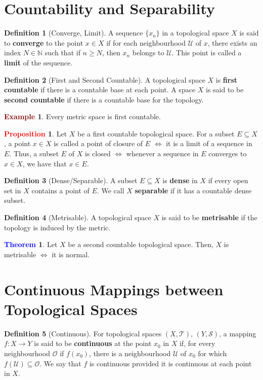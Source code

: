 \documentclass[11pt]{article}
\newcommand{\open}[0]{\mathcal{O}}
\newcommand{\topo}[0]{\mathcal{T}}
\newcommand{\hood}[0]{\mathcal{U}}
\theoremstyle{definition}
\theoremstyle{definition}
\newtheorem{theorem}{\textcolor{blue}{Theorem}}
\theoremstyle{definition}
\newtheorem{definition}{\textcolor{OliveGreen}{Definition}}
\newtheorem{prop}{\textcolor{red}{Proposition}}
\newtheorem{ex}{\textcolor{Maroon}{Example}}
\theoremstyle{remark}
\begin{document}
\section{Countability and Separability}
\begin{definition}[Converge, Limit]
	A sequence $\{ x_n \}$ in a topological space $X$ is said to \textbf{converge} to the point $x \in X$ if for each neighbourhood $\hood$ of $x$, there exists an index $N \in \mathbb{N}$ such that if $n \geq N$, then $x_n$ belongs to $\hood$. This point is called a \textbf{limit} of the sequence. 
\end{definition}

\begin{definition}[First and Second Countable]
	A topological space $X$ is \textbf{first countable} if there is a countable base at each point. A space $X$ is said to be \textbf{second countable} if there is a countable base for the topology.
\end{definition}

\begin{ex}
Every metric space is first countable. 	
\end{ex}

\begin{prop}
	Let $X$ be a first countable topological space. For a subset $E \subseteq X$, a point $x \in X$ is called a point of closure of $E$ $\iff$ it is a limit of a sequence in $E$. Thus, a subset $E$ of $X$ is closed $\iff$ whenever a sequence in $E$ converges to $x \in X$, we have that $x \in E$. 
\end{prop}

\begin{definition}[Dense/Separable]
	A subset $E \subseteq X$ is \textbf{dense} in $X$ if every open set in $X$ contains a point of $E$. We call $X$ \textbf{separable} if it has a countable dense subset. 
\end{definition}

\begin{definition}[Metrisable]
	A topological space $X$ is said to be \textbf{metrisable} if the topology is induced by the metric. 
\end{definition}

\begin{theorem}
	Let $X$ be a second countable topological space. Then, $X$ is metrisable $\iff$ it is normal. 
\end{theorem}


\section{Continuous Mappings between Topological Spaces}
\begin{definition}[Continuous]
	For topological spaces $(X, \topo)$, $(Y, \mathcal{S})$, a mapping $f: X \rightarrow Y$ is said to be \textbf{continuous} at the point $x_0$ in $X$ if, for every neighbourhood $\open$ if $f(x_0)$, there is a neighbourhood $\hood$ of $x_0$ for which $f(\hood) \subseteq \open$. We say that $f$ is continuous provided it is continuous at each point in $X$.  
\end{definition}
\end{document}

